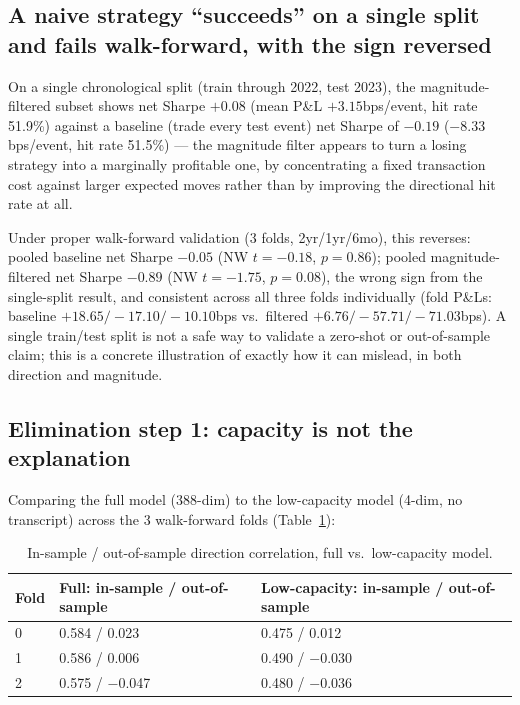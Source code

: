 \documentclass[11pt]{article}
\begin{document}
\subsection{A naive strategy ``succeeds'' on a single split and fails walk-forward, with the sign reversed}
\label{sec:naive-strategy}

On a single chronological split (train through 2022, test 2023), the magnitude-filtered subset shows net Sharpe $+0.08$ (mean P\&L $+3.15$bps/event, hit rate 51.9\%) against a baseline (trade every test event) net Sharpe of $-0.19$ ($-8.33$bps/event, hit rate 51.5\%) --- the magnitude filter appears to turn a losing strategy into a marginally profitable one, by concentrating a fixed transaction cost against larger expected moves rather than by improving the directional hit rate at all.

Under proper walk-forward validation (3 folds, 2yr/1yr/6mo), this reverses: pooled baseline net Sharpe $-0.05$ (NW $t=-0.18$, $p=0.86$); pooled magnitude-filtered net Sharpe $-0.89$ (NW $t=-1.75$, $p=0.08$), the wrong sign from the single-split result, and consistent across all three folds individually (fold P\&Ls: baseline $+18.65/-17.10/-10.10$bps vs.\ filtered $+6.76/-57.71/-71.03$bps). A single train/test split is not a safe way to validate a zero-shot or out-of-sample claim; this is a concrete illustration of exactly how it can mislead, in both direction and magnitude.

\subsection{Elimination step 1: capacity is not the explanation}

Comparing the full model (388-dim) to the low-capacity model (4-dim, no transcript) across the 3 walk-forward folds (Table~\ref{tab:capacity}):

\begin{table}[H]
\centering
\caption{In-sample / out-of-sample direction correlation, full vs.\ low-capacity model.}
\label{tab:capacity}
\begin{tabular}{@{}lll@{}}
\toprule
Fold & Full: in-sample / out-of-sample & Low-capacity: in-sample / out-of-sample \\
\midrule
0 & 0.584 / 0.023  & 0.475 / 0.012 \\
1 & 0.586 / 0.006  & 0.490 / $-$0.030 \\
2 & 0.575 / $-$0.047 & 0.480 / $-$0.036 \\
\bottomrule
\end{tabular}
\end{table}
\end{document}
